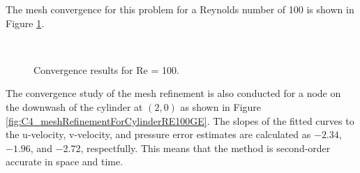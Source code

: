 %
The mesh convergence for this problem for a Reynolds number of 100 is shown in Figure \ref{fig:C4_meshConvergenceForCylidnerRE100GE}.
%
\begin{figure}[H]
    \centering
    \quad
    \\
    \caption{Convergence results for Re = 100.}
    \label{fig:C4_meshConvergenceForCylidnerRE100GE}
\end{figure}
%
The convergence study of the mesh refinement is also conducted for a node on the downwash of the cylinder at $(2, 0)$ as shown in Figure \ref{fig:C4_meshRefinementForCylinderRE100GE}. The slopes of the fitted curves to the u-velocity, v-velocity, and pressure error estimates are calculated as $-2.34$, $-1.96$, and $-2.72$, respectfully. This means that the method is second-order accurate in space and time.
%
